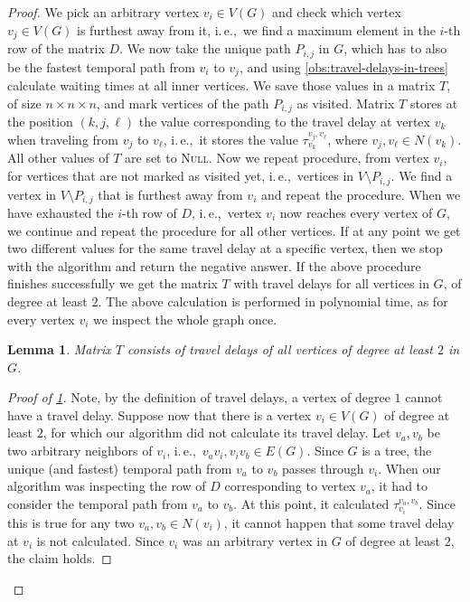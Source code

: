 \documentclass[11pt,a4paper]{article}
\newtheorem{lemma}[theorem]{Lemma}
\theoremstyle{remark}
\theoremstyle{definition}
\newcommand{\ie}{i.\,e.,\ }
\begin{document}
\begin{proof}
    We pick an arbitrary vertex $v_i \in V(G)$ and check which vertex $v_j \in V(G)$ is furthest away from it, \ie we find a maximum element in the $i$-th row of the matrix $D$.
    We now take the unique path $P_{i,j}$ in $G$, which has to also be the fastest temporal path from $v_i$ to $v_j$, and using \cref{obs:travel-delays-in-trees} calculate waiting times at all inner vertices.
    We save those values in a matrix $T$, of size $n \times n \times n$, and mark vertices of the path  $P_{i,j}$ as visited.
    Matrix $T$ stores at the position $(k,j,\ell)$ the value corresponding to the travel delay at vertex $v_k$ when traveling from $v_{j}$ to $v_{\ell}$, \ie it stores the value $\tau_{v_k}^{v_{j}, v_\ell}$, where $v_j,v_\ell \in N(v_k)$. All other values of $T$ are set to \textsc{Null}.
    Now we repeat procedure, from vertex $v_i$, for vertices that are not marked as visited yet, \ie vertices in $V \setminus P_{i,j}$.
    We find a vertex in $V \setminus P_{i,j}$ that is furthest away from $v_i$ and repeat the procedure.
    When we have exhausted the $i$-th row of $D$,
    \ie vertex $v_i$ now reaches every vertex of $G$,
    we continue and repeat the procedure for all other vertices.
    If at any point we get two different values for the same travel delay at a specific vertex, then we stop with the algorithm and return the negative answer.
    If the above procedure finishes successfully we get the matrix $T$ with travel delays for all vertices in $G$, of degree at least $2$.
    The above calculation is performed in polynomial time, as for every vertex $v_i$ we inspect the whole graph once.
    \begin{lemma}\label{lemma:matrixT-travelDelays-tree}
        Matrix $T$ consists of travel delays of all vertices of degree at least $2$ in $G$.
    \end{lemma}
    \begin{proof}[Proof of \cref{lemma:matrixT-travelDelays-tree}]
        Note, by the definition of travel delays, a vertex of degree $1$ cannot have a travel delay.
        Suppose now that there is a vertex $v_i \in V(G)$ of degree at least $2$, for which our algorithm did not calculate its travel delay.
        Let $v_a, v_b$ be two arbitrary neighbors of $v_i$, \ie $v_a v_i, v_i v_b \in E(G)$.
        Since $G$ is a tree, the unique (and fastest) temporal path from $v_a$ to $v_b$ passes through $v_i$.
        When our algorithm was inspecting the row of $D$ corresponding to vertex $v_a$, it had to consider the temporal path from $v_a$ to $v_b$. 
        At this point, it calculated $\tau_{v_i}^{v_a,v_b}$. 
        Since this is true for any two $v_a, v_b \in N(v_i)$, it cannot happen that some travel delay at $v_i$ is not calculated.
        Since $v_i$ was an arbitrary vertex in $G$ of degree at least $2$, the claim holds.
    \end{proof}
    

\end{proof}
\end{document}
